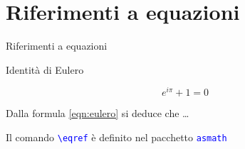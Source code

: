 \section{Riferimenti a equazioni}
  \begin{frame}{Riferimenti a equazioni}

    \begin{exampleblock}{Identità di Eulero}
      
    \end{exampleblock}

    \begin{equation}
      \label{eqn:eulero}
      e^{i\pi}+1=0
    \end{equation}

    Dalla formula \eqref{eqn:eulero} si deduce che \dots
    
    Il comando \texttt{\textcolor{blue}{\textbackslash eqref}} è definito nel pacchetto \texttt{\textcolor{blue}{asmath}}

\end{frame}
